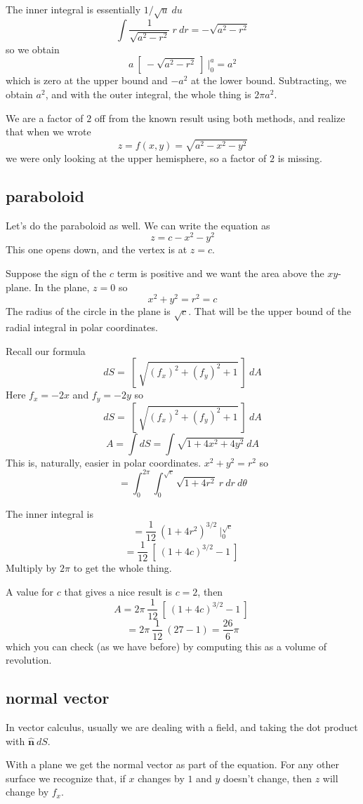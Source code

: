 \documentclass[11pt, oneside]{article}   	%
\begin{document}
The inner integral is essentially $1/\sqrt{u} \ du$
\[ \int \frac{1}{\sqrt{a^2 - r^2}} \ r \ dr = -\sqrt{a^2 - r^2}  \]
so we obtain
\[ a \ [ \ -\sqrt{a^2 - r^2} \ ] \ \bigg |_0^a = a^2 \]
which is zero at the upper bound and $-a^2$ at the lower bound.  Subtracting, we obtain $a^2$, and with the outer integral, the whole thing is $2 \pi a^2$.

We are a factor of $2$ off from the known result using both methods, and realize that when we wrote 
\[ z = f(x,y) = \sqrt{a^2 - x^2 - y^2} \]
we were only looking at the upper hemisphere, so a factor of $2$ is missing.

\subsection*{paraboloid}
Let's do the paraboloid as well.  We can write the equation as
\[ z =  c - x^2 - y^2 \]
This one opens down, and the vertex is at $z = c$.

Suppose the sign of the $c$ term is positive and we want the area above the $xy$-plane.  In the plane, $z = 0$ so
\[ x^2 + y^2 = r^2 = c \]
The radius of the circle in the plane is $\sqrt{c}$.  That will be the upper bound of the radial integral in polar coordinates.

Recall our formula
\[ dS = \ [ \ \sqrt{(f_x)^2 + (f_y)^2 + 1} \  ] \ dA \]
Here $f_x = -2x$ and $f_y = -2y$ so
\[ dS = \ [ \ \sqrt{(f_x)^2 + (f_y)^2 + 1} \  ] \ dA \]
\[ A = \int dS = \int \sqrt{1 + 4x^2 + 4y^2} \ dA \]
This is, naturally, easier in polar coordinates.  $x^2 + y^2 = r^2$ so
\[ = \int_0^{2 \pi} \int_0^{\sqrt{c}} \sqrt{1 + 4r^2} \ r \ dr \ d \theta \]

The inner integral is
\[ = \frac{1}{12} \ (1 + 4r^2)^{3/2} \ \bigg |_0^{\sqrt{c}} \]
\[ = \frac{1}{12} \ [ \ (1 + 4c)^{3/2} - 1 \ ] \ \]
Multiply by $2 \pi$ to get the whole thing.

A value for $c$ that gives a nice result is $c = 2$, then
\[ A = 2 \pi \ \frac{1}{12} \ [ \ (1 + 4c)^{3/2} - 1 \ ] \ \]
\[ = 2 \pi \ \frac{1}{12} \ (27 - 1) = \frac{26}{6} \pi \]
which you can check (as we have before) by computing this as a volume of revolution.
\subsection*{normal vector}
In vector calculus, usually we are dealing with a field, and taking the dot product with $\mathbf{\hat{n}} \ dS$.

With a plane we get the normal vector as part of the equation.  For any other surface we recognize that, if $x$ changes by $1$ and $y$ doesn't change, then $z$ will change by $f_x$. 
\end{document}

